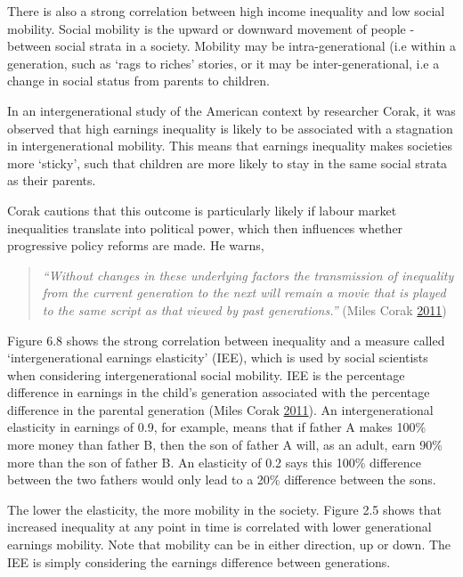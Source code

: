 \documentclass[]{tufte-handout}
\begin{document}
There is also a strong correlation between high income inequality and
low social mobility. Social mobility is the upward or downward movement
of people -between social strata in a society. Mobility may be
intra-generational (i.e within a generation, such as `rags to riches'
stories, or it may be inter-generational, i.e a change in social status
from parents to children.

In an intergenerational study of the American context by researcher
Corak, it was observed that high earnings inequality is likely to be
associated with a stagnation in intergenerational mobility. This means
that earnings inequality makes societies more `sticky', such that
children are more likely to stay in the same social strata as their
parents.

Corak cautions that this outcome is particularly likely if labour market
inequalities translate into political power, which then influences
whether progressive policy reforms are made. He warns,

\begin{quote}
\emph{``Without changes in these underlying factors the transmission of
inequality from the current generation to the next will remain a movie
that is played to the same script as that viewed by past generations.''
} (Miles Corak \protect\hyperlink{ref-MilesCorak2011}{2011})
\end{quote}

Figure 6.8 shows the strong correlation between inequality and a measure
called `intergenerational earnings elasticity' (IEE), which is used by
social scientists when considering intergenerational social mobility.
IEE is the percentage difference in earnings in the child's generation
associated with the percentage difference in the parental generation
(Miles Corak \protect\hyperlink{ref-MilesCorak2011}{2011}). An
intergenerational elasticity in earnings of 0.9, for example, means that
if father A makes 100\% more money than father B, then the son of father
A will, as an adult, earn 90\% more than the son of father B. An
elasticity of 0.2 says this 100\% difference between the two fathers
would only lead to a 20\% difference between the sons.

The lower the elasticity, the more mobility in the society. Figure 2.5
shows that increased inequality at any point in time is correlated with
lower generational earnings mobility. Note that mobility can be in
either direction, up or down. The IEE is simply considering the earnings
difference between generations.
\end{document}
